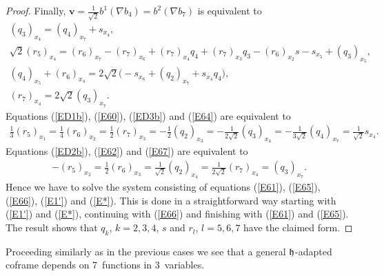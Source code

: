\documentclass[11pt]{article}
\numberwithin{equation}{section}
\newcommand\fh{{\frak h}}
\newcommand\bv{{\mathbf v}}
\begin{document}
\begin{proof}
Finally, $\bv=\frac1{\sqrt2} b^1(\nabla b_4)=b^2(\nabla b_7)$ is equivalent to
\begin{gather}
 (q_3)_{x_4}=(q_4)_{x_7}+s_{x_4}, \label{E64}\\
 \sqrt2(r_5)_{x_4}=(r_6)_{x_7} -(r_7)_{x_6}+(r_7)_{x_4}q_4+(r_7)_{x_3}q_3-(r_6)_{x_2}s - s_{x_5}+(q_3)_{x_5},\label{E65}\\
 (q_4)_{x_5}+(r_6)_{x_4} = 2\sqrt2 \big({-}s_{x_6}+ (q_2)_{x_7} +s_{x_4}q_4\big), \label{E66} \\
 (r_7)_{x_4} = 2\sqrt2 (q_3)_{x_7} . \label{E67}
\end{gather}
Equations (\ref{ED1b}), (\ref{E60}), (\ref{ED3b}) and (\ref{E64}) are equivalent to
\begin{gather}\label{E1'}
\tfrac13 (r_5)_{x_1} = \tfrac14 (r_6)_{x_2}=\tfrac12 (r_7)_{x_3} =-\tfrac12 (q_2)_{x_3}=-\tfrac 1{2\sqrt 2} (q_3)_{x_4}=-\tfrac1{3\sqrt2} (q_4)_{x_7}=\tfrac 1{\sqrt2} s_{x_4}.
\end{gather}
Equations (\ref{ED2b}), (\ref{E62}) and (\ref{E67}) are equivalent to
\begin{gather}\label{E*}
-(r_5)_{x_2}=\tfrac12 (r_6)_{x_3}=\tfrac1{\sqrt 2}(q_2)_{x_4}=\tfrac1 {2\sqrt2}(r_7)_{x_4} =(q_3)_{x_7} .
\end{gather}
Hence we have to solve the system consisting of equations (\ref{E61}), (\ref{E65}), (\ref{E66}), (\ref{E1'}) and (\ref{E*}). This is done in a straightforward way starting with (\ref{E1'}) and (\ref{E*}), continuing with (\ref{E66}) and finishing with (\ref{E61}) and (\ref{E65}).
The result shows that $q_k$, $k=2,3,4$, $s$ and $r_l$, $l=5,6,7$ have the claimed form. \end{proof}

\begin{Remark} Proceeding similarly as in the previous cases we see that a general $\fh$-adapted coframe depends on 7~functions in 3~variables.
\end{Remark}
\end{document}
